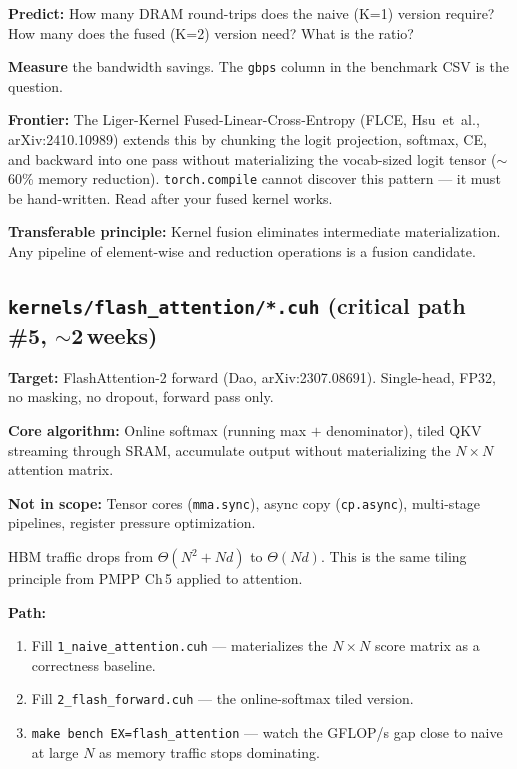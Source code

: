 \documentclass[11pt, letterpaper]{article}
\begin{document}
\begin{stepbox}
\textbf{Predict:} How many DRAM round-trips does the naive (K=1) version require? How many does the fused (K=2) version need? What is the ratio?

\textbf{Measure} the bandwidth savings. The \texttt{gbps} column in the benchmark CSV is the question.
\end{stepbox}

\textbf{Frontier:} The Liger-Kernel Fused-Linear-Cross-Entropy (FLCE, Hsu~et~al., arXiv:2410.10989) extends this by chunking the logit projection, softmax, CE, and backward into one pass without materializing the vocab-sized logit tensor ($\sim$60\% memory reduction). \texttt{torch.compile} cannot discover this pattern --- it must be hand-written. Read after your fused kernel works.

\textbf{Transferable principle:} Kernel fusion eliminates intermediate materialization. Any pipeline of element-wise and reduction operations is a fusion candidate.

\subsection{\texttt{kernels/flash\_attention/*.cuh} (critical path \#5, $\sim$2\,weeks)}

\textbf{Target:} FlashAttention-2 forward (Dao, arXiv:2307.08691). Single-head, FP32, no masking, no dropout, forward pass only.

\textbf{Core algorithm:} Online softmax (running max $+$ denominator), tiled QKV streaming through SRAM, accumulate output without materializing the $N \times N$ attention matrix.

\textbf{Not in scope:} Tensor cores (\texttt{mma.sync}), async copy (\texttt{cp.async}), multi-stage pipelines, register pressure optimization.

HBM traffic drops from $\Theta(N^2 + Nd)$ to $\Theta(Nd)$. This is the same tiling principle from PMPP Ch\,5 applied to attention.

\textbf{Path:}
\begin{enumerate}
\item Fill \texttt{1\_naive\_attention.cuh} --- materializes the $N \times N$ score matrix as a correctness baseline.
\item Fill \texttt{2\_flash\_forward.cuh} --- the online-softmax tiled version.
\item \texttt{make bench EX=flash\_attention} --- watch the GFLOP/s gap close to naive at large $N$ as memory traffic stops dominating.
\end{enumerate}
\end{document}
